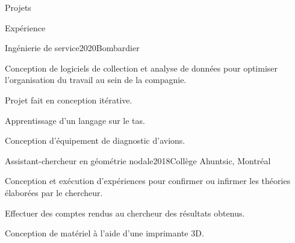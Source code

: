 \documentclass[french,12pt]{resume} %
\begin{document}
\begin{rSection}{Projets}
		

		
	\end{rSection}
	
	\begin{rSection}{Expérience}
		
		\begin{rSubsection}{Ingénierie de service}{2020}{Bombardier}{}{}
			\item Conception de logiciels de collection et analyse de données pour optimiser l'organisation du travail au sein de la compagnie.
			\item Projet fait en conception itérative. 
			\item Apprentissage d'un langage sur le tas.
			\item Conception d'équipement de diagnostic d'avions.
		\end{rSubsection}
		
		\begin{rSubsection}{Assistant-chercheur en géométrie nodale}{2018}{Collège Ahuntsic, Montréal}{}
			\item 	Conception et exécution d'expériences pour confirmer ou infirmer les théories élaborées par le chercheur.
			\item   Effectuer des comptes rendus au chercheur des résultats obtenus.
			\item   Conception de matériel à l’aide d’une imprimante 3D.
		\end{rSubsection}
		
		
	\end{rSection}
	
\end{document}
